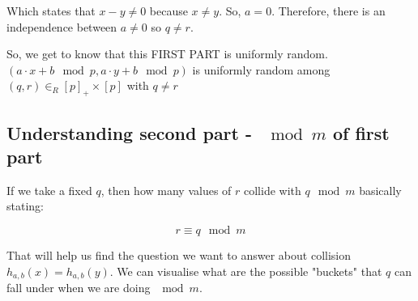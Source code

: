 \documentclass{article}
\begin{document}
Which states that $x-y \neq 0$ because $x \neq y$. So, $a = 0$. Therefore, there is an independence between $a \neq 0$ so $q \neq r$.

So, we get to know that this FIRST PART is uniformly random. $(a\cdot x + b \mod p, a \cdot y + b \mod p)$ is uniformly random among $(q,r) \in_{R} {[p]}_{+} \times [p]$ with $q \neq r$

\subsection{Understanding second part - $\mod m$ of first part}

If we take a fixed $q$, then how many values of $r$ collide with $q \mod m$ basically stating:

$$
r \equiv q \mod m
$$

That will help us find the question we want to answer about collision $h_{a,b}(x) = h_{a,b}(y)$. We can visualise what are the possible "buckets" that $q$ can fall under when we are doing $\mod m$. 
\end{document}
